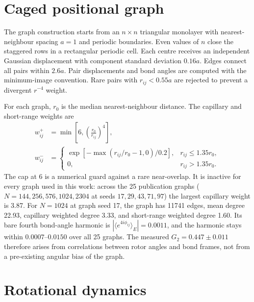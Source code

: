 \documentclass[aps,prl,onecolumn,superscriptaddress,nofootinbib]{revtex4-2}
\begin{document}
\section{Caged positional graph}

The graph construction starts from an \(n\times n\) triangular monolayer with
nearest-neighbour spacing \(a=1\) and periodic boundaries.  Even values of
\(n\) close the staggered rows in a rectangular periodic cell.  Each centre
receives an independent Gaussian displacement with component standard
deviation \(0.16a\).  Edges connect all pairs within \(2.6a\).  Pair
displacements and bond angles are computed with the minimum-image
convention.  Rare pairs with \(r_{ij}<0.55a\) are rejected to prevent a
divergent \(r^{-4}\) weight.

For each graph, \(r_0\) is the median nearest-neighbour distance.  The
capillary and short-range weights are
\begin{align}
 w^+_{ij}&=\min\left[6,\left(\frac{r_0}{r_{ij}}\right)^4\right],
 \label{eq:supp-cap-weight}\\
 w^-_{ij}&=
 \begin{cases}
 \exp[-\max(r_{ij}/r_0-1,0)/0.2],&r_{ij}\leq1.35r_0,\\
 0,&r_{ij}>1.35r_0.
 \end{cases}
 \label{eq:supp-short-weight}
\end{align}
The cap at 6 is a numerical guard against a rare near-overlap.  It is
inactive for every graph used in this work: across the 25 publication graphs
(\(N=144,256,576,1024,2304\) at seeds \(17,29,43,71,97\)) the largest
capillary weight is 3.87.  For \(N=1024\) at graph seed 17, the graph has
11741 edges, mean degree 22.93, capillary weighted degree 3.33, and
short-range weighted degree 1.60.  Its bare fourth bond-angle harmonic is
\(\left|\langle e^{4i\phi_{ij}}\rangle_E\right|=0.0011\), and the harmonic
stays within \(0.0007\)--\(0.0150\) over all 25 graphs.  The measured
\(G_2=0.447\pm0.011\) therefore arises from correlations between rotor angles
and bond frames, not from a pre-existing angular bias of the graph.

\section{Rotational dynamics}
\end{document}
